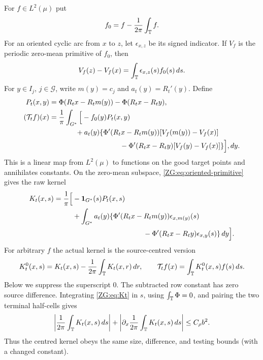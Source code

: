 For $f\in L^2(\mu)$ put
\[
 f_0=f-\frac1{2\pi}\int_\mathbb T f.
\]
For an oriented cyclic arc from $x$ to $z$, let
$\epsilon_{x,z}$ be its signed indicator.  If $V_f$ is the periodic
zero-mean primitive of $f_0$, then
\begin{equation}\label{ZG:eq:oriented-primitive}
 V_f(z)-V_f(x)=\int_\mathbb T\epsilon_{x,z}(s)f_0(s)\,ds.
\end{equation}
For $y\in I_j$, $j\in\mathcal G$, write $m(y)=c_j$ and
$a_t(y)=R_t'(y)$.  Define
\begin{align}
 P_t(x,y)&=\Phi(R_t x-R_t m(y))-\Phi(R_t x-R_t y),
 \label{ZG:eq:Pt}\\
 (\mathcal T_tf)(x)
 &=\frac1\pi\int_{G^*}
 \Big[-f_0(y)P_t(x,y)\notag\\
 &\hspace{13mm}+a_t(y)\{\Phi'(R_tx-R_tm(y))
       [V_f(m(y))-V_f(x)]\notag\\
 &\hspace{35mm}-\Phi'(R_tx-R_ty)
       [V_f(y)-V_f(x)]\}\Big],dy .
 \label{ZG:eq:Tt}
\end{align}
This is a linear map from $L^2(\mu)$ to functions on the good target
points and annihilates constants.  On the zero-mean subspace,
\eqref{ZG:eq:oriented-primitive} gives the raw kernel
\begin{align}
 K_t(x,s)=\frac1\pi\Big[&-\mathbf1_{G^*}(s)P_t(x,s)
 \notag\\
 &+\int_{G^*}a_t(y)
 \{\Phi'(R_tx-R_tm(y))\epsilon_{x,m(y)}(s)\notag\\
 &\hspace{35mm}-\Phi'(R_tx-R_ty)\epsilon_{x,y}(s)\}\,dy\Big].
 \label{ZG:eq:Kt}
\end{align}
For arbitrary $f$ the actual kernel is the source-centred version
\begin{equation}\label{ZG:eq:Kt-centred}
 K_t^0(x,s)=K_t(x,s)-\frac1{2\pi}\int_\mathbb T K_t(x,r)\,dr,
 \qquad
 \mathcal T_tf(x)=\int_\mathbb T K_t^0(x,s)f(s)\,ds.
\end{equation}
Below we suppress the superscript $0$.  The subtracted row constant has
zero source difference.  Integrating \eqref{ZG:eq:Kt} in $s$, using
$\int_\mathbb T\Phi=0$, and pairing the two terminal half-cells gives
\begin{equation}\label{ZG:eq:row-gauge}
 \left|\frac1{2\pi}\int_\mathbb T K_t(x,s)\,ds\right|
 +\left|\partial_x\frac1{2\pi}\int_\mathbb T K_t(x,s)\,ds\right|
 \le C_\rho b^2.
\end{equation}
Thus the centred kernel obeys the same size, difference, and testing
bounds (with a changed constant).

